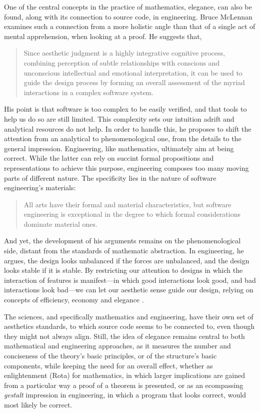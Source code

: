 One of the central concepts in the practice of mathematics, elegance, can also be found, along with its connection to source code, in engineering. Bruce McLennan examines such a connection from a more holistic angle than that of a single act of mental apprehension, when looking at a proof. He suggests that,

\begin{quote}
  Since aesthetic judgment is a highly integrative cognitive process, combining perception of subtle relationships with conscious and unconscious intellectual and emotional interpretation, it can be used to guide the design process by forming an overall assessment of the myriad interactions in a complex software system. \citep{schummer_aesthetic_2009}
\end{quote}

His point is that software is too complex to be easily verified, and that tools to help us do so are still limited. This complexity sets our intuition adrift and analytical resources do not help. In order to handle this, he proposes to shift the attention from an analytical to phenomenological one, from the details to the general impression. Engineering, like mathematics, ultimately aim at being correct. While the latter can rely on succint formal propositions and representations to achieve this purpose, engineering composes too many moving parts of different nature. The specificity lies in the nature of software engineering's materials:

\begin{quote}
  All arts have their formal and material characteristics, but software engineering is exceptional in the degree to which formal considerations dominate material ones. \citep{schummer_aesthetic_2009}
\end{quote}

And yet, the development of his arguments remains on the phenomenological side, distant from the standards of mathematic abstraction. In engineering, he argues, the design looks unbalanced if the forces are unbalanced, and the design looks stable if it is stable.  By restricting our attention to designs in which the interaction of features is manifest—in which good interactions look good, and bad interactions look bad—we can let our aesthetic sense guide our design, relying on concepts of efficiency, economy and elegance \citep{mclennan_who_1997}.

The sciences, and specifically mathematics and engineering, have their own set of aesthetics standards, to which source code seems to be connected to, even though they might not always align. Still, the idea of elegance remains central to both mathematical and engineering approaches, as it measures the number and conciseness of the theory's basic principles, or of the structure's basic components, while keeping the need for an overall effect, whether as enlightenment (Rota) for mathematics, in which larger implications are gained from a particular way a proof of a theorem is presented, or as an ecompassing \emph{gestalt} impression in engineering, in which a program that looks correct, would most likely be correct.

